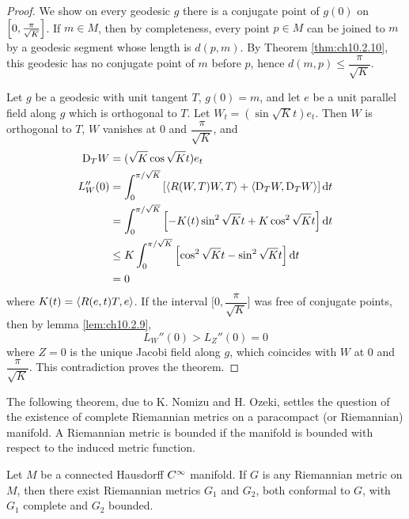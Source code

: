 \documentclass[../main]{subfiles}
\begin{document}
\begin{proof}
We show on every geodesic $g$ there is a conjugate point of $g(0)$ on $\left[0,\frac\pi{\sqrt K}\right]$. If $m\in M$, then by completeness, every point $p\in M$ can be joined to $m$ by a geodesic segment whose length is $d(p,m)$. By Theorem \ref{thm:ch10.2.10}, this geodesic has no conjugate point of $m$ before $p$, hence $d(m,p)\le\dfrac\pi{\sqrt K}$.

Let $g$ be a geodesic with unit tangent $T$, $g(0)=m$, and let $e$ be a unit parallel field along $g$ which is orthogonal to $T$. Let $W_t=(\sin\sqrt Kt)e_t$. Then $W$ is orthogonal to $T$, $W$ vanishes at 0 and $\dfrac\pi{\sqrt K}$, and
\begin{align*}
\mathrm{D}_TW &= (\sqrt K\cos\sqrt Kt)e_t \\
L_W''(0) &= \int_0^{\pi/\sqrt K}\left[\left\langle R(W,T)W,T\right\rangle+\left\langle\mathrm{D}_TW,\mathrm{D}_TW\right\rangle\right]\mathrm{d}t \\
&= \int_0^{\pi/\sqrt K}\left[-K(t)\sin^2\sqrt Kt+K\cos^2\sqrt Kt\right]\mathrm{d}t \\
&\le K\int_0^{\pi/\sqrt K}\left[\cos^2\sqrt Kt-\sin^2\sqrt Kt\right]\mathrm{d}t \\
&=0
\end{align*}
where $K(t)=\left\langle R(e,t)T,e\right\rangle$. If the interval $\Big[0,\dfrac\pi{\sqrt K}\Big]$ was free of conjugate points, then by lemma \ref{lem:ch10.2.9},
\[L_W''(0) > L_Z''(0) = 0\]
where $Z=0$ is the unique Jacobi field along $g$, which coincides with $W$ at 0 and $\dfrac\pi{\sqrt K}$. This contradiction proves the theorem.
\end{proof}



The following theorem, due to K. Nomizu and H. Ozeki, settles the question of the existence of complete Riemannian metrics on a paracompact (or Riemannian) manifold. A Riemannian metric is bounded if the manifold is bounded with respect to the induced metric function.



\begin{theorem} \label{thm:ch10.5.3}
Let $M$ be a connected Hausdorff $C^\infty$ manifold. If $G$ is any Riemannian metric on $M$, then there exist Riemannian metrics $G_1$ and $G_2$, both conformal to $G$, with $G_1$ complete and $G_2$ bounded.
\end{theorem}
\end{document}
